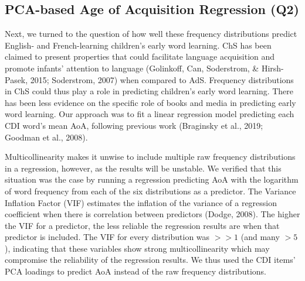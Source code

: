 \documentclass[10pt, letterpaper]{article}
\begin{document}
\hypertarget{pca-based-age-of-acquisition-regression-q2}{%
\subsection{PCA-based Age of Acquisition Regression
(Q2)}\label{pca-based-age-of-acquisition-regression-q2}}

Next, we turned to the question of how well these frequency
distributions predict English- and French-learning children's early word
learning. ChS has been claimed to present properties that could
facilitate language acquisition and promote infants' attention to
language (Golinkoff, Can, Soderstrom, \& Hirsh-Pasek, 2015; Soderstrom,
2007) when compared to AdS. Frequency distributions in ChS could thus
play a role in predicting children's early word learning. There has been
less evidence on the specific role of books and media in predicting
early word learning. Our approach was to fit a linear regression model
predicting each CDI word's mean AoA, following previous work (Braginsky
et al., 2019; Goodman et al., 2008).

Multicollinearity makes it unwise to include multiple raw frequency
distributions in a regression, however, as the results will be unstable.
We verified that this situation was the case by running a regression
predicting AoA with the logarithm of word frequency from each of the six
distributions as a predictor. The Variance Inflation Factor (VIF)
estimates the inflation of the variance of a regression coefficient when
there is correlation between predictors (Dodge, 2008). The higher the
VIF for a predictor, the less reliable the regression results are when
that predictor is included. The VIF for every distribution was \(>>1\)
(and many \(>5\)), indicating that these variables show strong
multicollinearity which may compromise the reliability of the regression
results. We thus used the CDI items' PCA loadings to predict AoA instead
of the raw frequency distributions.
\end{document}
